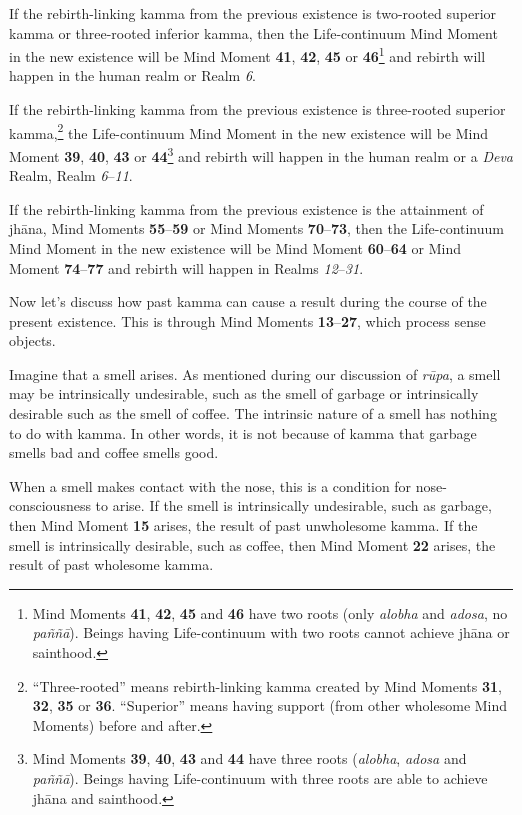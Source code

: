 If the rebirth-linking kamma from the previous existence is two-rooted superior kamma or three-rooted inferior kamma, then the Life-continuum Mind Moment in the new existence will be Mind Moment \textbf{41}, \textbf{42}, \textbf{45} or \textbf{46}\footnote{Mind Moments \textbf{41}, \textbf{42}, \textbf{45} and \textbf{46} have two roots (only \textit{alobha} and \textit{adosa}, no \textit{paññā}). Beings having Life-continuum with two roots cannot achieve jhāna or sainthood.} and rebirth will happen in the human realm or Realm \textit{6}. 

If the rebirth-linking kamma from the previous existence is three-rooted superior kamma,\footnote{“Three-rooted” means rebirth-linking kamma created by Mind Moments \textbf{31}, \textbf{32}, \textbf{35} or \textbf{36}. “Superior” means having support (from other wholesome Mind Moments) before and after.} the Life-continuum Mind Moment in the new existence will be Mind Moment \textbf{39}, \textbf{40}, \textbf{43} or \textbf{44}\footnote{Mind Moments \textbf{39}, \textbf{40}, \textbf{43} and \textbf{44} have three roots (\textit{alobha}, \textit{adosa} and \textit{paññā}). Beings having Life-continuum with three roots are able to achieve jhāna and sainthood.} and rebirth will happen in the human realm or a \textit{Deva} Realm, Realm \textit{6}--\textit{11}.

If the rebirth-linking kamma from the previous existence is the attainment of jhāna, Mind Moments \textbf{55}--\textbf{59} or Mind Moments \textbf{70}--\textbf{73}, then the Life-continuum Mind Moment in the new existence will be Mind Moment \textbf{60}--\textbf{64} or Mind Moment \textbf{74}--\textbf{77} and rebirth will happen in Realms \textit{12}--\textit{31}.

Now let’s discuss how past kamma can cause a result during the course of the present existence. This is through Mind Moments \textbf{13}--\textbf{27}, which process sense objects.

Imagine that a smell arises. As mentioned during our discussion of \textit{rūpa}, a smell may be intrinsically undesirable, such as the smell of garbage or intrinsically desirable such as the smell of coffee. The intrinsic nature of a smell has nothing to do with kamma. In other words, it is not because of kamma that garbage smells bad and coffee smells good.

\pagebreak

When a smell makes contact with the nose, this is a condition for nose-consciousness to arise. If the smell is intrinsically undesirable, such as garbage, then Mind Moment \textbf{15} arises, the result of past unwholesome kamma. If the smell is intrinsically desirable, such as coffee, then Mind Moment \textbf{22} arises, the result of past wholesome kamma.


